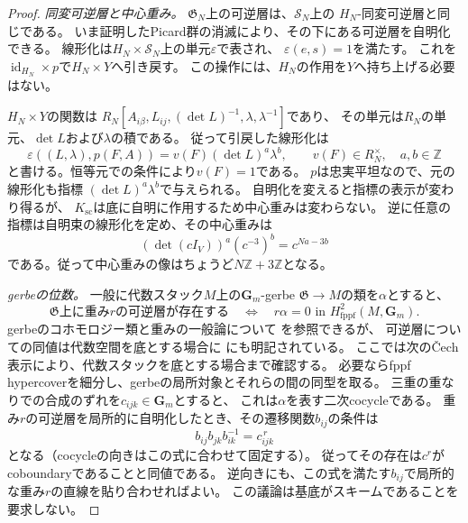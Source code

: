 \begin{proof}
\emph{同変可逆層と中心重み。}
$\mathfrak G_N$上の可逆層は、$\mathcal S_N$上の
$H_N$-同変可逆層と同じである。
いま証明したPicard群の消滅により、その下にある可逆層を自明化できる。
線形化は$H_N\times\mathcal S_N$上の単元$\varepsilon$で表され、
$\varepsilon(e,s)=1$を満たす。
これを$\operatorname{id}_{H_N}\times p$で$H_N\times Y$へ引き戻す。
この操作には、$H_N$の作用を$Y$へ持ち上げる必要はない。

$H_N\times Y$の関数は
$R_N[A_{i\beta},L_{ij},(\det L)^{-1},\lambda,\lambda^{-1}]$であり、
その単元は$R_N$の単元、$\det L$および$\lambda$の積である。
従って引戻した線形化は
\begin{equation}
 \varepsilon((L,\lambda),p(F,A))
       =v(F)(\det L)^a\lambda^b,
 \qquad v(F)\in R_N^\times,\quad a,b\in\mathbb Z
 \label{eq:pg-intrinsic-gerbe-linearization-character}
\end{equation}
と書ける。恒等元での条件により$v(F)=1$である。
$p$は忠実平坦なので、元の線形化も指標
$(\det L)^a\lambda^b$で与えられる。
自明化を変えると指標の表示が変わり得るが、
$K_{\mathrm{sc}}$は底に自明に作用するため中心重みは変わらない。
逆に任意の指標は自明束の線形化を定め、その中心重みは
\begin{equation}
 (\det(cI_V))^a(c^{-3})^b=c^{Na-3b}
 \label{eq:pg-intrinsic-gerbe-character-weight}
\end{equation}
である。従って中心重みの像はちょうど$N\mathbb Z+3\mathbb Z$となる。

\emph{gerbeの位数。}
一般に代数スタック$M$上の$\mathbf G_m$-gerbe
$\mathfrak G\to M$の類を$\alpha$とすると、
\begin{equation}
 \mathfrak G\text{上に重み$r$の可逆層が存在する}
 \quad\Longleftrightarrow\quad
 r\alpha=0\text{ in }H^2_{\mathrm{fppf}}(M,\mathbf G_m).
 \label{eq:pg-intrinsic-gerbe-weight-period-criterion}
\end{equation}
gerbeのコホモロジー類と重みの一般論について
\cite[Theorem~3.11, Corollary~4.11]{PBerghSchnurerGerbes}を参照できるが、
可逆層についての同値は代数空間を底とする場合に
\cite[Lemma~3.1.1.8, p.~7]{PLieblichPeriodIndex}にも明記されている。
ここでは次の\v{C}ech表示により、代数スタックを底とする場合まで確認する。
必要ならfppf hypercoverを細分し、gerbeの局所対象とそれらの間の同型を取る。
三重の重なりでの合成のずれを$c_{ijk}\in\mathbf G_m$とすると、
これは$\alpha$を表す二次cocycleである。
重み$r$の可逆層を局所的に自明化したとき、その遷移関数$b_{ij}$の条件は
\begin{equation}
 b_{ij}b_{jk}b_{ik}^{-1}=c_{ijk}^{\,r}
 \label{eq:pg-intrinsic-gerbe-weight-cocycle}
\end{equation}
となる（cocycleの向きはこの式に合わせて固定する）。
従ってその存在は$c^r$がcoboundaryであることと同値である。
逆向きにも、この式を満たす$b_{ij}$で局所的な重み$r$の直線を貼り合わせればよい。
この議論は基底がスキームであることを要求しない。


\end{proof}
